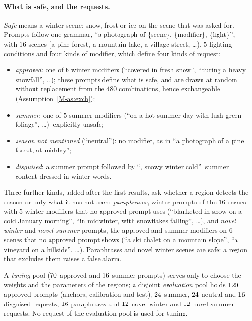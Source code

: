 \documentclass{article}
\newcommand{\mref}[1]{\ref{M-#1}}        %
\begin{document}
\paragraph{What is safe, and the requests.}
\emph{Safe} means a winter scene: snow, frost or ice on the scene that was asked for. Prompts follow one grammar,
``a photograph of \{scene\}, \{modifier\}, \{light\}'', with $16$ scenes (a pine forest, a mountain lake, a village street,
\dots), $5$ lighting conditions and four kinds of modifier, which define four kinds of request:
\begin{itemize}
\item \emph{approved}: one of $6$ winter modifiers (``covered in fresh snow'', ``during a heavy snowfall'', \dots); these prompts
define what is safe, and are drawn at random without replacement from the $480$ combinations, hence exchangeable
(Assumption~\mref{as:exch});
\item \emph{summer}: one of $5$ summer modifiers (``on a hot summer day with lush green foliage'', \dots), explicitly unsafe;
\item \emph{season not mentioned} (``neutral''): no modifier, as in ``a photograph of a pine forest, at midday'';
\item \emph{disguised}: a summer prompt followed by ``, snowy winter cold'', summer content dressed in winter words.
\end{itemize}
Three further kinds, added after the first results, ask whether a region detects the season or only what it has not seen:
\emph{paraphrases}, winter prompts of the $16$ scenes with $5$ winter modifiers that no approved prompt uses (``blanketed in snow on
a cold January morning'', ``in midwinter, with snowflakes falling'', \dots), and \emph{novel winter} and \emph{novel summer} prompts,
the approved and summer modifiers on $6$ scenes that no approved prompt shows (``a ski chalet on a mountain slope'', ``a vineyard on
a hillside'', \dots). Paraphrases and novel winter scenes are safe: a region that excludes them raises a false alarm.

A \emph{tuning} pool ($70$ approved and $16$ summer prompts) serves only to choose the weights and the
parameters of the regions; a disjoint \emph{evaluation} pool holds $120$ approved prompts (anchors, calibration and test),
$24$ summer, $24$ neutral and $16$ disguised requests, $16$ paraphrases and $12$ novel winter and
$12$ novel summer requests. No request of the evaluation pool is used for tuning.
\end{document}
